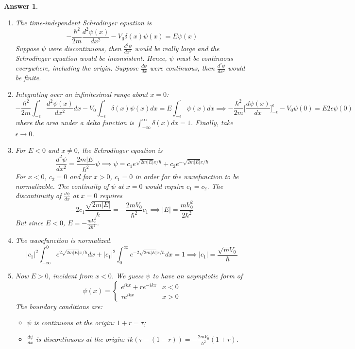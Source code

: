 \documentclass[a4paper]{article}
\newtheorem{ans}{Answer}[subsection]
\theoremstyle{new}
\begin{document}
\begin{ans}\leavevmode
\begin{enumerate}[label=(\roman*)]
\item The time-independent Schrodinger equation is
$$-\frac{\hbar^2}{2m}\frac{d^2\psi(x)}{dx^2}-V_0\delta(x)\psi(x)=E\psi(x)$$
Suppose $\psi$ were discontinuous, then $\frac{d^2\psi}{dx^2}$ would be really large and the Schrodinger equation would be inconsistent. Hence, $\psi$ must be continuous everywhere, including the origin. Suppose $\frac{d\psi}{dx}$ were continuous, then $\frac{d^2\psi}{dx^2}$ would be finite.
\item Integrating over an infinitesimal range about $x=0$:
$$-\frac{\hbar^2}{2m}\int_{-\epsilon}^\epsilon\frac{d^2\psi(x)}{dx^2}dx-V_0\int_{-\epsilon}^\epsilon\delta(x)\psi(x)dx=E\int_{-\epsilon}^\epsilon\psi(x)dx\implies-\frac{\hbar^2}{2m}\bigg[\frac{d\psi(x)}{dx}\bigg]_{-\epsilon}^\epsilon-V_0\psi(0)=E2\epsilon\psi(0)$$
where the area under a delta function is $\int_{-\infty}^\infty\delta(x)dx=1$. Finally, take $\epsilon\rightarrow 0$.
\item For $E<0$ and $x\neq 0$, the Schrodinger equation is
$$\frac{d^2\psi}{dx^2}=\frac{2m|E|}{\hbar^2}\psi\implies\psi=c_1e^{\sqrt{2m|E|}x/\hbar}+c_2e^{-\sqrt{2m|E|}x/\hbar}$$
For $x<0$, $c_2=0$ and for $x>0$, $c_1=0$ in order for the wavefunction to be normalizable. The continuity of $\psi$ at $x=0$ would require $c_1=c_2$. The discontinuity of $\frac{d\psi}{dx}$ at $x=0$ requires
$$-2c_1\frac{\sqrt{2m|E|}}{\hbar}=-\frac{2mV_0}{\hbar^2}c_1\implies |E|=\frac{mV_0^2}{2\hbar^2}$$
But since $E<0$, $E=-\frac{mV_0^2}{2\hbar^2}$.
\item The wavefunction is normalized.
$$|c_1|^2\int_{-\infty}^0e^{2\sqrt{2m|E|}x/\hbar}dx+|c_1|^2\int_0^\infty e^{-2\sqrt{2m|E|}x/\hbar}dx=1\implies |c_1|=\frac{\sqrt{mV_0}}{\hbar}$$
\item Now $E>0$, incident from $x<0$. We guess $\psi$ to have an asymptotic form of
$$\psi(x)=
\left\{
        \begin{array}{ll}
      e^{ikx}+re^{-ikx} & x<0\\
      \tau e^{ikx} & x>0
        \end{array}
    \right.$$ 
The boundary conditions are:
\begin{itemize}
    \item $\psi$ is continuous at the origin: $1+r=\tau$;
    \item $\frac{d\psi}{dx}$ is discontinuous at the origin: $ik(\tau-(1-r))=-\frac{2mV_0}{\hbar^2}(1+r)$.
\end{itemize}

\end{enumerate}
\end{ans}
\end{document}
